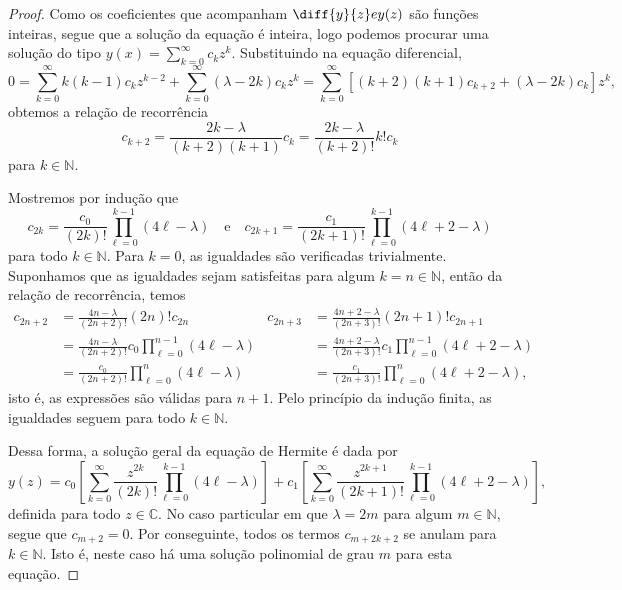 \begin{proof}
    Como os coeficientes que acompanham \(\diff{y}{z} e y(z)\) são funções inteiras, segue que a solução da equação é inteira, logo podemos procurar uma solução do tipo \(y(x) = \sum_{k=0}^\infty c_kz^k\). Substituindo na equação diferencial,
    \begin{equation*}
        0=\sum_{k=0}^\infty k(k-1)c_k z^{k-2} + \sum_{k=0}^\infty (\lambda - 2k)c_kz^k =\sum_{k=0}^\infty \left[(k+2)(k+1)c_{k+2} + (\lambda - 2k)c_k\right] z^k,
    \end{equation*}
    obtemos a relação de recorrência
    \begin{equation*}
        c_{k+2} = \frac{2k - \lambda}{(k+2)(k+1)}c_k = \frac{2k - \lambda}{(k+2)!} k! c_k
    \end{equation*}
    para \(k \in \mathbb{N}\).

    Mostremos por indução que
    \begin{equation*}
        c_{2k} = \frac{c_0}{(2k)!}\prod_{\ell = 0}^{k-1}(4\ell - \lambda)\quad\text{e}\quad
        c_{2k+1} = \frac{c_1}{(2k+1)!}\prod_{\ell = 0}^{k-1}(4\ell+2 - \lambda)
    \end{equation*}
    para todo \(k \in \mathbb{N}\). Para \(k = 0\), as igualdades são verificadas trivialmente. Suponhamos que as igualdades sejam satisfeitas para algum \(k = n \in \mathbb{N}\), então da relação de recorrência, temos
    \begin{align*}
        c_{2n + 2} &= \frac{4n - \lambda}{(2n+2)!}(2n)! c_{2n}&
        c_{2n + 3} &= \frac{4n + 2 - \lambda}{(2n+3)!}(2n + 1)!c_{2n+1}\\
                   &= \frac{4n - \lambda}{(2n+2)!} c_0 \prod_{\ell = 0}^{n - 1} (4\ell - \lambda)&
                   &= \frac{4n + 2- \lambda}{(2n+3)!} c_1 \prod_{\ell = 0}^{n - 1} (4\ell + 2- \lambda)\\
                   &= \frac{c_0}{(2n+2)!} \prod_{\ell = 0}^n (4\ell - \lambda)&
                   &= \frac{c_1}{(2n+3)!} \prod_{\ell = 0}^n (4\ell + 2 - \lambda),
    \end{align*}
    isto é, as expressões são válidas para \(n+1\). Pelo princípio da indução finita, as igualdades seguem para todo \(k \in \mathbb{N}\).

    Dessa forma, a solução geral da equação de Hermite é dada por
    \begin{equation*}
        y(z) = c_0\left[ \sum_{k = 0}^\infty \frac{z^{2k}}{(2k)!}\prod_{\ell = 0}^{k - 1} (4\ell - \lambda)\right] + c_1\left[ \sum_{k = 0}^\infty \frac{z^{2k + 1}}{(2k+1)!}\prod_{\ell = 0}^{k - 1} (4\ell + 2 - \lambda)\right],
    \end{equation*}
    definida para todo \(z \in \mathbb{C}\). No caso particular em que \(\lambda = 2m\) para algum \(m \in \mathbb{N}\), segue que \(c_{m+2} = 0\). Por conseguinte, todos os termos \(c_{m+2k+2}\) se anulam para \(k \in \mathbb{N}\). Isto é, neste caso há uma solução polinomial de grau \(m\) para esta equação.
\end{proof}
